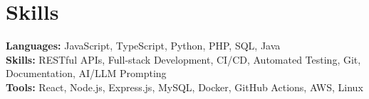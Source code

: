 \documentclass[11pt]{article}
\begin{document}
\vspace{-18.5pt}

\section*{Skills}
\textbf{Languages:} JavaScript, TypeScript, Python, PHP, SQL, Java\\
\textbf{Skills:} RESTful APIs, Full-stack Development, CI/CD, Automated Testing, Git, Documentation, AI/LLM Prompting\\
\textbf{Tools:} React, Node.js, Express.js, MySQL, Docker, GitHub Actions, AWS, Linux

\vspace{-6.5pt}
\end{document}

